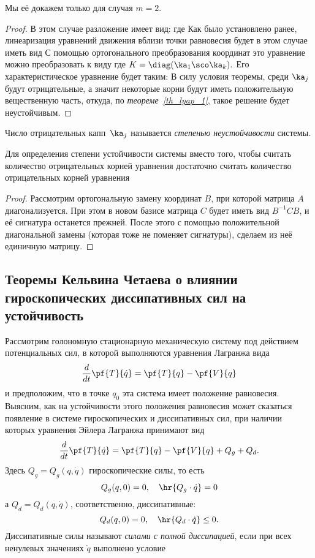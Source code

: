 \documentclass[a4paper,12pt]{article}
\newcommand{\tdf}[1]{\textsl{#1}}
\newcommand{\tstm}[1]{\emph{#1}}
\newcommand{\spr}[2]{\hr{#1 \cdot #2}}
\newcommand{\eql}[2]{\begin{equation}\label{#2}#1\end{equation}}
\begin{document}
Мы её докажем только для случая $m=2$.
\begin{proof}
В этом случае разложение имеет вид:
 где
 Как было установлено
ранее, линеаризация уравнений движения вблизи точки равновесия будет
в этом случае иметь вид  С помощью
ортогонального преобразования координат это уравнение можно
преобразовать к виду  где
$K=\diag(\ka_1\sco\ka_k).$ Его характеристическое уравнение будет
таким:  В силу
условия теоремы, среди $\ka_j$ будут отрицательные, а значит
некоторые корни будут иметь положительную вещественную часть,
откуда, по \tstm{теореме~\ref{th_lyap_1}}, такое решение будет неустойчивым.
\end{proof}
\begin{df}
Число отрицательных капп~$\ka_j$ называется \tdf{степенью неустойчивости}
системы.
\end{df}
\begin{stm}
\label{stm::signature}
Для определения степени устойчивости системы вместо того, чтобы считать количество
отрицательных корней уравнения
достаточно считать количество отрицательных корней уравнения
\end{stm}
\begin{proof}
Рассмотрим ортогональную замену координат $B$, при которой матрица $A$ диагонализуется.
При этом в новом базисе матрица $C$ будет иметь вид $B^{-1} CB$, и её сигнатура останется
прежней. После этого с помощью положительной диагональной замены (которая тоже не поменяет сигнатуры),
сделаем из неё единичную матрицу.
\end{proof}
\subsection{Теоремы Кельвина Четаева о влиянии гироскопических диссипативных сил на устойчивость}

Рассмотрим голономную стационарную механическую систему под действием потенциальных сил, в которой
выполняются уравнения Лагранжа вида \eql{\frac{d}{dt}\pf{T}{\dot{q}}=\pf{T}{q}-\pf{V}{q}}{La} и
предположим, что в точке $q_0$ эта система имеет положение равновесия. Выясним, как на устойчивости
этого положения равновесия может сказаться появление в системе гироскопических и диссипативных сил,
при наличии которых уравнения Эйлера Лагранжа принимают вид
\eql{\frac{d}{dt}\pf{T}{\dot{q}}=\pf{T}{q}-\pf{V}{q}+Q_g+Q_d.}{Lgd} Здесь $Q_g=Q_g(q,\dot{q})$
гироскопические силы, то есть
\eql{Q_g(q,0)=0,\quad\spr{Q_g}{\dot{q}}=0}{g_eq,} а
$Q_d=Q_d(q,\dot{q})$, соответственно, диссипативные:
\eql{Q_d(q,0)=0,\quad \spr{Q_d}{\dot{q}}\le0.}{d_eq}
Диссипативные силы называют \tdf{силами с полной диссипацией}, если при
всех ненулевых значениях $\dot{q}$ выполнено условие
\equ{\spr{Q_d}{\dot{q}}<0.}
\end{document}
